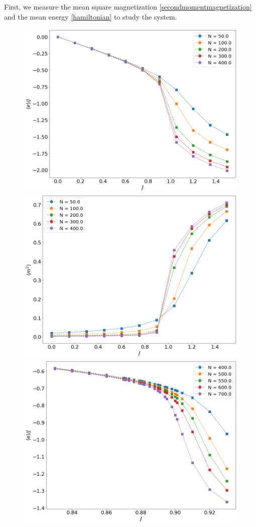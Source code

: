  First, we measure the mean square magnetization \eqref{secondmomentmagnetization} and the mean energy \eqref{hamiltonian} to  study the system. 
 \begin{figure}
	\centering
	\includegraphics[scale=0.23]{Images/3_energy_shortchains.png}
	\includegraphics[scale=0.23]{Images/3_magnetization2_shortchains.png} \\
	\includegraphics[scale=0.23]{Images/3_energy_longchains.png}

\end{figure}
